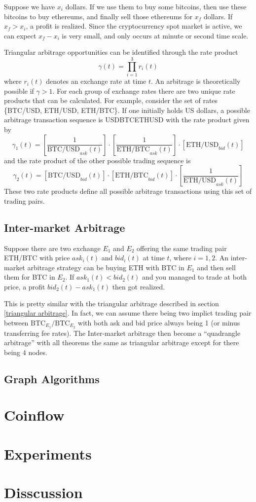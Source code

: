 \documentclass{myarticle}
\begin{document}
    Suppose we have $x_i$ dollars. If we use them to buy some bitcoins, then use these bitcoins to buy ethereums, and
    finally sell those ethereums for $x_f$ dollars. If $x_f > x_i$, a profit is realized. Since the cryptocurrency spot
    market is active, we can expect $x_f - x_i$ is very small, and only occurs at minute or second time scale.

    Triangular arbitrage opportunities can be identified through the rate product
    \[ \gamma(t) = \prod_{i=1}^{3}r_i(t) \]
    where $r_i(t)$ denotes an exchange rate at time $t$. An arbitrage is theoretically possible if $\gamma > 1$. For each
    group of exchange rates there are two unique rate products that can be calculated. For example, consider the set of
    rates \{BTC/USD, ETH/USD, ETH/BTC\}. If one initially holds US dollars, a possible arbitrage transaction sequence is
    USD\textrightarrow{}BTC\textrightarrow{}ETH\textrightarrow{}USD with the rate product given by
    \[ \gamma_1(t) = \left[\frac{1}{\text{BTC/USD}_{ask}(t)}\right]\cdot
                     \left[\frac{1}{\text{ETH/BTC}_{ask}(t)}\right]\cdot
                     \left[\text{ETH/USD}_{bid}(t)\right] \]
    and the rate product of the other possible trading sequence is
    \[ \gamma_2(t) = \left[\text{BTC/USD}_{bid}(t)\right]\cdot
                     \left[\text{ETH/BTC}_{bid}(t)\right]\cdot
                     \left[\frac{1}{\text{ETH/USD}_{ask}(t)}\right] \]
    These two rate products define all possible arbitrage transactions using this set of trading pairs.\cite{fenn2009mirage}

    \subsection{Inter-market Arbitrage}

    Suppose there are two exchange $E_1$ and $E_2$ offering the same trading pair ETH/BTC with price $ask_i(t)$ and $bid_i(t)$
    at time $t$, where $i = {1,2}$. An inter-market arbitrage strategy can be buying ETH with BTC in $E_1$ and then sell
    them for BTC in $E_2$. If $ask_1(t) < bid_2(t)$ and you managed to trade at both price, a profit $bid_2(t) - ask_1(t)$
    then got realized.

    This is pretty similar with the triangular arbitrage described in section \ref{triangular arbitrage}. In fact, we can
    assume there being two implict trading pair between $\text{BTC}_{E_1} \text{/} \text{BTC}_{E_2}$ with both ask and
    bid price always being 1 (or minus transferring fee rates). The Inter-market arbitrage then become a ``quadrangle arbitrage''
    with all theorems the same as triangular arbitrage except for there being 4 nodes.

    \subsection{Graph Algorithms}

    \section{Coinflow}
    \section{Experiments}
    \section{Disscussion}


    
\end{document}

